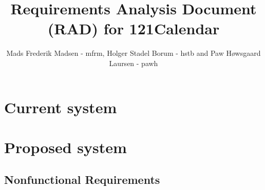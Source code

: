 \documentclass{article}
\begin{document}
\title{Requirements Analysis Document (RAD) for 121Calendar}
\author{Mads Frederik Madsen - mfrm, Holger Stadel Borum - hstb and Paw Høwsgaard Laursen - pawh}
\maketitle
\tableofcontents

\section{Current system}
\section{Proposed system}
	\subsection{Nonfunctional Requirements}
\end{document}
